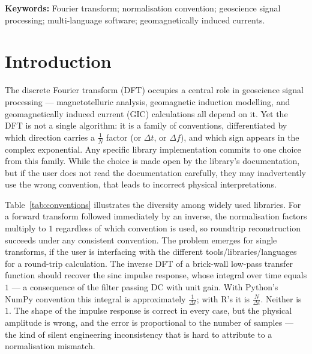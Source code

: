 \documentclass[12pt,a4paper]{article}
\begin{document}
\textbf{Keywords:} Fourier transform; normalisation convention; geoscience signal
processing; multi-language software; geomagnetically induced currents.

\section{Introduction}

The discrete Fourier transform (DFT) occupies a central role in geoscience signal
processing --- magnetotelluric analysis, geomagnetic induction modelling, and
geomagnetically induced current (GIC) calculations all depend on it. Yet the DFT
is not a single algorithm: it is a family of conventions, differentiated by which
direction carries a $\frac{1}{N}$ factor (or $\Delta t$, or $\Delta f$), and which sign
appears in the complex exponential. Any specific library implementation commits
to one choice from this family. While the choice is made open by the library's documentation, 
but if the user does not read the documentation carefully, they may inadvertently use the 
wrong convention, that leads to incorrect physical interpretations.

Table~\ref{tab:conventions} illustrates the diversity among widely used libraries.
For a forward transform followed immediately by an inverse, the normalisation
factors multiply to $1$ regardless of which convention is used, so roundtrip
reconstruction succeeds under any consistent convention. The problem emerges for
single transforms, if the user is interfacing with the different tools/libraries/languages 
for a round-trip calculation. The inverse DFT of a brick-wall low-pass transfer function
should recover the sinc impulse response, whose integral over time equals $1$
--- a consequence of the filter passing DC with unit gain. With Python's NumPy convention
this integral is approximately $\frac{1}{\Delta t}$; with R's it is $\frac{N}{\Delta t}$. Neither
is $1$. The shape of the impulse response is correct in every case, but the
physical amplitude is wrong, and the error is proportional to the number of
samples --- the kind of silent engineering inconsistency that is hard to attribute
to a normalisation mismatch.
\end{document}

